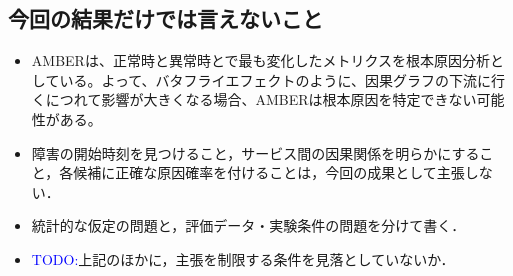 \subsection{今回の結果だけでは言えないこと}
\begin{itemize}
    \item AMBERは、正常時と異常時とで最も変化したメトリクスを根本原因分析としている。よって、バタフライエフェクトのように、因果グラフの下流に行くにつれて影響が大きくなる場合、AMBERは根本原因を特定できない可能性がある。
    \item 障害の開始時刻を見つけること，サービス間の因果関係を明らかにすること，各候補に正確な原因確率を付けることは，今回の成果として主張しない．
    \item 統計的な仮定の問題と，評価データ・実験条件の問題を分けて書く．
    \item \textcolor{blue}{TODO:}上記のほかに，主張を制限する条件を見落としていないか．
\end{itemize}
